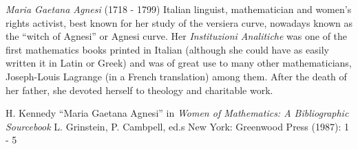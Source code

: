 \documentclass[12pt]{article}
\begin{document}

\emph{Maria Gaetana Agnesi} (1718 - 1799) Italian linguist, mathematician and women's rights activist, best known for her study of the versiera curve, nowadays known as the ``witch of Agnesi'' or Agnesi curve. Her {\it Instituzioni Analitiche} was one of the first mathematics books printed in Italian (although she could have as easily written it in Latin or Greek) and was of great use to many other mathematicians, Joseph-Louis Lagrange (in a French translation) among them. After the death of her father, she devoted herself to theology and charitable work.

\begin{thebibliography}{1}
 H. Kennedy ``Maria Gaetana Agnesi'' in {\it Women of Mathematics: A Bibliographic Sourcebook} L. Grinstein, P. Cambpell, ed.s New York: Greenwood Press (1987): 1 - 5
\end{thebibliography}
\end{document}
